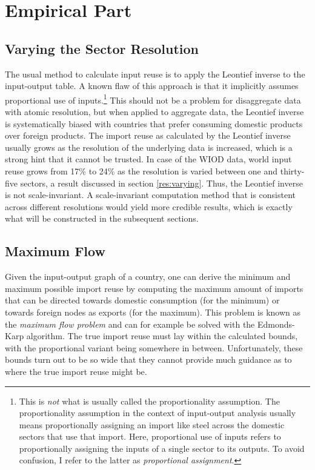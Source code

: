 \documentclass{paper}
\begin{document}
\section{Empirical Part}

\subsection{Varying the Sector Resolution}
\label{Varying}
The usual method to calculate input reuse is to apply the Leontief inverse to the input-output table. A known flaw of this approach is that it implicitly assumes proportional use of inputs.\footnote{This is \emph{not} what is usually called the proportionality assumption. The proportionality assumption in the context of input-output analysis usually means proportionally assigning an import like steel across the domestic sectors that use that import. Here, proportional use of inputs refers to proportionally assigning the inputs of a single sector to its outputs. To avoid confusion, I refer to the latter as \emph{proportional assignment}.} This should not be a problem for disaggregate data with atomic resolution, but when applied to aggregate data, the Leontief inverse is systematically biased with countries that prefer consuming domestic products over foreign products. The import reuse as calculated by the Leontief inverse usually grows as the resolution of the underlying data is increased, which is a strong hint that it cannot be trusted. In case of the WIOD data, world input reuse grows from 17\% to 24\% as the resolution is varied between one and thirty-five sectors, a result discussed in section \ref{res:varying}. Thus, the Leontief inverse is not scale-invariant. A scale-invariant computation method that is consistent across different resolutions would yield more credible results, which is exactly what will be constructed in the subsequent sections.

\subsection{Maximum Flow}
Given the input-output graph of a country, one can derive the minimum and maximum possible import reuse by computing the maximum amount of imports that can be directed towards domestic consumption (for the minimum) or towards foreign nodes as exports (for the maximum). This problem is known as the \emph{maximum flow problem} and can for example be solved with the Edmonds-Karp algorithm. \cite{edmonds1972theoretical} The true import reuse must lay within the calculated bounds, with the proportional variant being somewhere in between. Unfortunately, these bounds turn out to be so wide that they cannot provide much guidance as to where the true import reuse might be.
\end{document}
